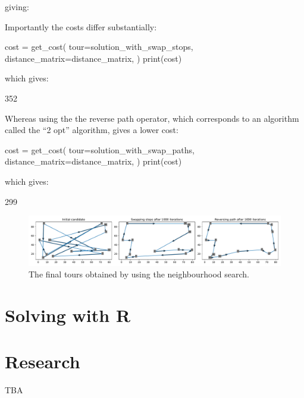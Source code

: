 giving:

\begin{pyout}
[0, 7, 2, 6, 10, 4, 11, 12, 9, 1, 3, 5, 8, 0]
\end{pyout}

Importantly the costs differ substantially:

\begin{pyin}
cost = get_cost(
    tour=solution_with_swap_stops,
    distance_matrix=distance_matrix,
)
print(cost)
\end{pyin}

which gives:

\begin{pyout}
352
\end{pyout}

Whereas using the the reverse path operator, which corresponds to an algorithm
called the ``2 opt'' algorithm, gives a lower cost:

\begin{pyin}
cost = get_cost(
    tour=solution_with_swap_paths,
    distance_matrix=distance_matrix,
)
print(cost)
\end{pyin}

which gives:

\begin{pyout}
299
\end{pyout}

\begin{figure}
    \begin{center}
        \includegraphics[width=\textwidth]{./assets/final-tsp-tours/main.pdf}
    \end{center}
    \caption{The final tours obtained by using the neighbourhood search.}
    \label{fig:final-tsp-tours}
\end{figure}


\section{Solving with R}\label{sec:solving-with-R}

\section{Research}\label{sec:research}

TBA
